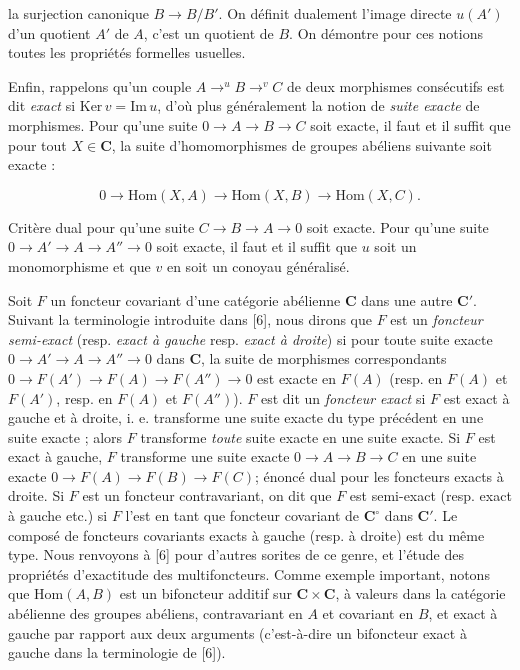 
\noindent la surjection canonique $B\to B/B'$. On définit
dualement l'image directe $u(A')$ d'un quotient $A'$ de $A$, c'est un quotient
de $B$. On démontre pour ces notions toutes les propriétés formelles usuelles.

Enfin, rappelons qu'un couple $A\mathrel{\mathop{\to}^{u}}B \mathrel{\mathop{\to}^{v}}C$ de deux morphismes consécutifs est dit \textit{exact} si
$\mathrm{Ker}\,v=\mathrm{Im}\,u$, d'où plus généralement la notion de
\textit{suite exacte} de morphismes. Pour qu'une suite $0\to A\to B\to C$ soit exacte, il faut et il suffit que pour tout $X\in\mathbf{C}$, la suite
d'homomorphismes de groupes abéliens suivante soit exacte :

\[
  0\to\mathrm{Hom}(X,A)\to\mathrm{Hom}(X,B)
  \to\mathrm{Hom}(X,C).
\]

\noindent Critère dual pour qu'une suite
$C\to B\to A\to0$ soit exacte. Pour
qu'une suite $0\to A'\to A\to A''\to0$ soit exacte, il faut et il suffit que $u$ soit un monomorphisme et
que $v$ en soit un conoyau généralisé.

Soit $F$ un foncteur covariant d'une catégorie abélienne $\mathbf{C}$ dans une autre
$\mathbf{C}'$. Suivant la terminologie introduite dans [6], nous dirons que $F$ est un
\textit{foncteur semi-exact} (resp. \textit{exact à gauche} resp.
\textit{exact à droite}) si pour toute suite exacte $0\to A'\to A\to A''\to0$ dans $\mathbf{C}$, la suite de morphismes correspondants $0\to F(A')\to F(A)\to F(A'') \to0$ est exacte en $F(A)$ (resp. en $F(A)$ et $F(A')$, resp. en $F(A)$
et $F(A'')$). $F$ est dit un \textit{foncteur exact} si $F$ est exact à gauche
et à droite, i. e. transforme une suite exacte du type précédent en une suite
exacte ; alors $F$ transforme \textit{toute} suite exacte en une suite exacte.
Si $F$ est exact à gauche, $F$ transforme une suite exacte $0\to A\to B\to C$ en une suite exacte $0\to F(A)\to F(B)\to F(C)$; énoncé dual pour les foncteurs exacts à droite. Si $F$ est un
foncteur contravariant, on dit que $F$ est semi-exact (resp. exact à gauche
etc.) si $F$ l'est en tant que foncteur covariant de $\mathbf{C}^\circ$ dans $\mathbf{C}'$. Le
composé de foncteurs covariants exacts à gauche (resp. à droite) est du même
type. Nous renvoyons à [6] pour d'autres sorites de ce genre, et l'étude des
propriétés d'exactitude des multifoncteurs. Comme exemple important, notons que
$\mathrm{Hom}(A,B)$ est un bifoncteur additif sur $\mathbf{C}\times\mathbf{C}$, à valeurs dans
la catégorie abélienne des groupes abéliens, contravariant en $A$ et covariant
en $B$, et exact à gauche par rapport aux deux arguments (c'est-à-dire un
bifoncteur exact à gauche dans la terminologie de [6]).

